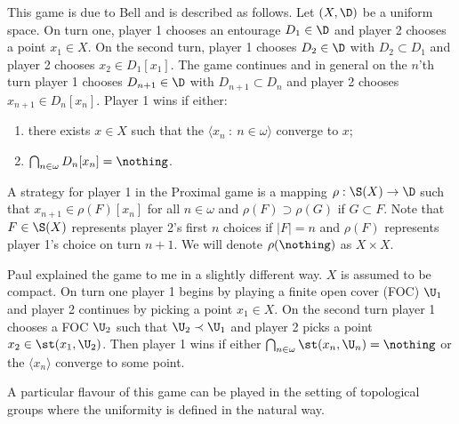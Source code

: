 \documentclass{article}
\begin{document}
This game is due to Bell and is described as follows. Let \((X, \D)\) be a uniform space. On turn one, player 1 chooses an entourage \(D_1 \in \D\) and player 2 chooses a point \(x_1 \in X\). On the second turn, player 1 chooses \(D_2 \in \D\) with \(D_2 \subset D_1\) and player 2 chooses \(x_2 \in D_1[x_1]\). The game continues and in general on the \(n\)'th turn player 1 chooses \(D_{n + 1} \in \D\) with \(D_{n + 1} \subset D_n\) and player 2 chooses \(x_{n + 1} \in D_n[x_n]\). Player 1 wins if either: 

\begin{enumerate}
    \item there exists \(x \in X\) such that the \(\langle x_n \: : \: n \in \omega\rangle\) converge to \(x\);
    \item \(\bigcap_{n \in \omega}D_n[x_n] = \nothing\).
\end{enumerate}
\begin{defn}
    A strategy for player 1 in the Proximal game is a mapping \(\rho: \S(X) \to \D\) such that \(x_{n + 1} \in \rho(F)[x_n]\) for all \(n \in \omega\) and \(\rho(F) \supset \rho(G)\) if \(G \subset F\). Note that \(F \in \S(X)\) represents player 2's first \(n\) choices if \(|F| = n\) and \(\rho(F)\) represents player 1's choice on turn \(n + 1\). We will denote \(\rho(\nothing)\) as \(X \times X\).
\end{defn}
\begin{rem}
    Paul explained the game to me in a slightly different way. \(X\) is assumed to be compact. On turn one player 1 begins by playing a finite open cover (FOC) \(\U_1\) and player 2 continues by picking a point \(x_1 \in X\). On the second turn player 1 chooses a FOC \(\U_2\) such that \(\U_2 \prec \U_1\) and player 2 picks a point \(x_2 \in \st(x_1, \U_2)\). Then player 1 wins if either \(\bigcap_{n \in \omega}\st(x_n, \U_n) = \nothing\) or the \(\langle x_n \rangle\) converge to some point. 
\end{rem}
A particular flavour of this game can be played in the setting of topological groups where the uniformity is defined in the natural way.
\end{document}
